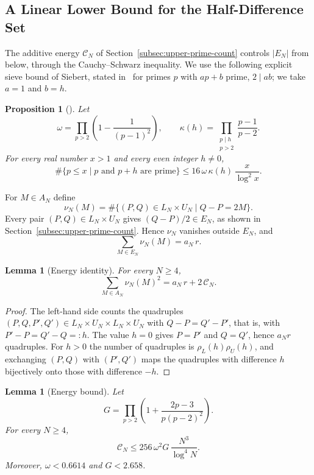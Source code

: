 \documentclass[11pt]{amsart}
\newtheorem{Proposition}[Theorem]{Proposition}
\newtheorem{Lemma}[Theorem]{Lemma}
\theoremstyle{definition}
\theoremstyle{remark}
\begin{document}
\subsection{A Linear Lower Bound for the Half-Difference Set}\label{subsec:linear}
The additive energy $\mathcal C_N$ of Section~\ref{subsec:upper-prime-count} controls $|E_N|$ from below, through the Cauchy--Schwarz inequality. We use the following explicit sieve bound of Siebert, stated in~\cite{siebert1976montgomery} for primes $p$ with $ap+b$ prime, $2\mid ab$; we take $a=1$ and $b=h$.
\begin{Proposition}[{\cite{siebert1976montgomery}}]\label{prop:siebert}
Let
\[
\omega=\prod_{p>2}\left(1-\frac{1}{(p-1)^2}\right),\qquad
\kappa(h)=\prod_{\substack{p\mid h\\ p>2}}\frac{p-1}{p-2}.
\]
For every real number $x>1$ and every even integer $h\neq 0$,
\[
\#\{p\leq x \mid p \text{ and } p+h \text{ are prime}\}\leq 16\,\omega\,\kappa(h)\,\frac{x}{\log^2 x}.
\]
\end{Proposition}
For $M\in A_N$ define
\[
\nu_N(M)=\#\{(P,Q)\in L_N\times U_N\mid Q-P=2M\}.
\]
Every pair $(P,Q)\in L_N\times U_N$ gives $(Q-P)/2\in E_N$, as shown in Section~\ref{subsec:upper-prime-count}. Hence $\nu_N$ vanishes outside $E_N$, and
\[
\sum_{M\in E_N}\nu_N(M)=a_N\,r.
\]
\begin{Lemma}[Energy identity]\label{lem:energy}
For every $N\geq 4$,
\[
\sum_{M\in A_N}\nu_N(M)^2=a_N\,r+2\,\mathcal C_N.
\]
\end{Lemma}
\begin{proof}
The left-hand side counts the quadruples $(P,Q,P',Q')\in L_N\times U_N\times L_N\times U_N$ with $Q-P=Q'-P'$, that is, with $P'-P=Q'-Q=:h$. The value $h=0$ gives $P=P'$ and $Q=Q'$, hence $a_N r$ quadruples. For $h>0$ the number of quadruples is $\rho_L(h)\rho_U(h)$, and exchanging $(P,Q)$ with $(P',Q')$ maps the quadruples with difference $h$ bijectively onto those with difference $-h$.
\end{proof}
\begin{Lemma}[Energy bound]\label{lem:energy-bound}
Let
\[
G=\prod_{p>2}\left(1+\frac{2p-3}{p(p-2)^2}\right).
\]
For every $N\geq 4$,
\[
\mathcal C_N\leq 256\,\omega^2 G\,\frac{N^3}{\log^4 N}.
\]
Moreover, $\omega<0.6614$ and $G<2.658$.
\end{Lemma}
\end{document}
